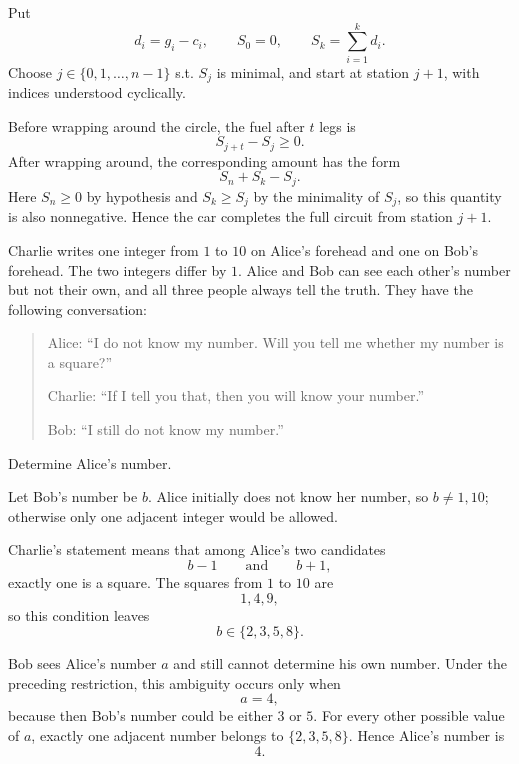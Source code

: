     \begin{solution}
        Put
        \[
            d_i=g_i-c_i,
            \qquad
            S_0=0,
            \qquad
            S_k=\sum_{i=1}^{k}d_i.
        \]
        Choose $j\in\{0,1,\ldots,n-1\}$ s.t. $S_j$ is minimal, and start
        at station $j+1$, with indices understood cyclically.

        Before wrapping around the circle, the fuel after $t$ legs is
        \[
            S_{j+t}-S_j\geq0.
        \]
        After wrapping around, the corresponding amount has the form
        \[
            S_n+S_k-S_j.
        \]
        Here $S_n\geq0$ by hypothesis and $S_k\geq S_j$ by the minimality of
        $S_j$, so this quantity is also nonnegative. Hence the car completes the
        full circuit from station $j+1$.
    \end{solution}

    \begin{expectedproblem}
        Charlie writes one integer from $1$ to $10$ on Alice's forehead and one
        on Bob's forehead. The two integers differ by $1$. Alice and Bob can
        see each other's number but not their own, and all three people always
        tell the truth. They have the following conversation:
        \begin{quote}
            Alice: ``I do not know my number. Will you tell me whether my number
            is a square?''

            Charlie: ``If I tell you that, then you will know your number.''

            Bob: ``I still do not know my number.''
        \end{quote}
        Determine Alice's number.
    \end{expectedproblem}

    \begin{solution}
        Let Bob's number be $b$. Alice initially does not know her number, so
        $b\neq1,10$; otherwise only one adjacent integer would be allowed.

        Charlie's statement means that among Alice's two candidates
        \[
            b-1
            \qquad\text{and}\qquad
            b+1,
        \]
        exactly one is a square. The squares from $1$ to $10$ are
        \[
            1,4,9,
        \]
        so this condition leaves
        \[
            b\in\{2,3,5,8\}.
        \]

        Bob sees Alice's number $a$ and still cannot determine his own number.
        Under the preceding restriction, this ambiguity occurs only when
        \[
            a=4,
        \]
        because then Bob's number could be either $3$ or $5$. For every other
        possible value of $a$, exactly one adjacent number belongs to
        $\{2,3,5,8\}$. Hence Alice's number is
        \[
            \boxed{4}.
        \]
    \end{solution}

